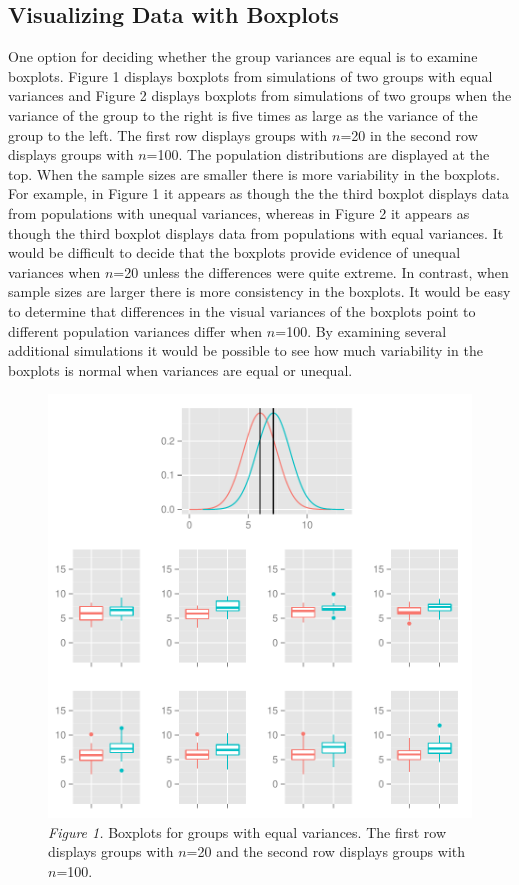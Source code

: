\documentclass[man,a4paper,noextraspace,apacite]{apa6}
\begin{document}
\subsection{Visualizing Data with Boxplots} 
    One option for deciding whether the group variances are equal is to examine boxplots. Figure 1 displays boxplots from simulations of two groups with equal variances and Figure 2 displays boxplots from simulations of two groups when the variance of the group to the right is five times as large as the variance of the group to the left. The first row displays groups with $n$=20 in the second row displays groups with $n$=100. The population distributions are displayed at the top. When the sample sizes are smaller there is more variability in the boxplots. For example, in Figure 1 it appears as though the the third boxplot displays data from populations with unequal variances, whereas in Figure 2 it appears as though the third boxplot displays data from populations with equal variances. It would be difficult to decide that the boxplots provide evidence of unequal variances when $n$=20 unless the differences were quite extreme. In contrast, when sample sizes are larger there is more consistency in the boxplots. It would be easy to determine that differences in the visual variances of the boxplots point to different population variances differ when $n$=100. By examining several additional simulations it would be possible to see how much variability in the boxplots is normal when variances are equal or unequal.
   
\begin{figure}
\includegraphics{WelchManuscript-MASTER-varEqualBoxplots}
\textit{Figure 1.} Boxplots for groups with equal variances. The first row displays groups with $n$=20 and the second row displays groups with $n$=100.
\end{figure}
\end{document}
